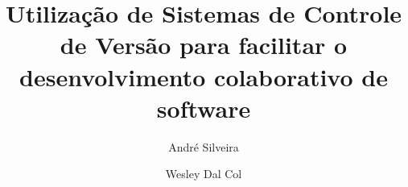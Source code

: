 \documentclass[12pt, times, a4paper, capchap, abnt-emphasize=bf]{abnt}
\author{Andr\'e Silveira \and Wesley Dal Col}
\title{Utiliza\c c\~ao de Sistemas de Controle de Vers\~ao para facilitar o desenvolvimento colaborativo de software}
\begin{document}
\maketitle



\sumario








\end{document}

